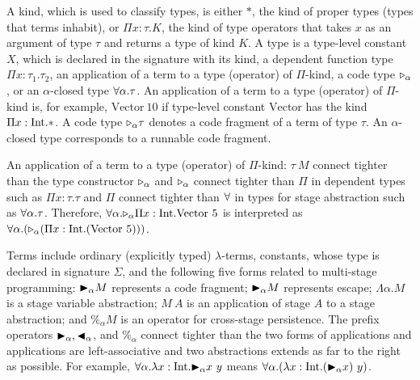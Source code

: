 


A kind, which is used to classify types, is either $*$, the kind of
proper types (types that terms inhabit), or $\Pi x\colon\tau.K$, the kind
of type operators that takes $x$ as an argument of type $\tau$ and returns a type
of kind $K$.
A type is a type-level constant $X$, which is declared in the signature with its kind, a dependent function type $\Pi x:\tau_1.\tau_2$,
an application of a term to a type (operator) of $\Pi$-kind, a code type ${\mathop{\triangleright}}_\alpha$, or an $\alpha$-closed type $\forall\alpha.\tau$.
An application of a term to a type (operator) of $\Pi$-kind is, for example, $\text{Vector}\ 10$
if type-level constant $\text{Vector}$ has the kind $\Pi x:\textrm{Int}.*$.
A code type ${\mathop{\triangleright}}_\alpha \tau$ denotes a code fragment of a term of type $\tau$.
An $\alpha$-closed type corresponds to a runnable code fragment.

An application of a term to a type (operator) of $\Pi$-kind: $\tau\ M$ connect tighter than
the type constructor ${\mathop{\triangleright}}_{\alpha}$ and ${\mathop{\triangleright}}_{\alpha}$ connect tighter than
$\Pi$ in dependent types such as $\Pi x:\tau.\tau$ and $\Pi$ connect tighter than
$\forall$ in types for stage abstraction such as $\forall\alpha.\tau$.
Therefore, $\F\alpha.\TW_{\alpha} \Pi x:\I.\text{Vector}\ 5$ is interpreted as
$\F\alpha.(\TW_{\alpha} (\Pi x:\I.(\text{Vector}\ 5)))$.


Terms include ordinary (explicitly typed) \(\lambda\)-terms, constants,
whose type is declared in signature $\Sigma$, and the following five forms
related to multi-stage programming:
${\mathop{\blacktriangleright}}_\alpha M$ represents a code fragment; ${\mathop{\blacktriangleright}}_\alpha M$ represents escape;
$\Lambda\alpha.M$ is a stage variable abstraction;
$M\ A$ is an application of stage $A$ to a stage abstraction; and
$\%_\alpha M$ is an operator for cross-stage persistence.
The prefix operators ${\mathop{\blacktriangleright}}_\alpha, {\mathop{\blacktriangleleft}}_\alpha$, and $\%_\alpha$ connect tighter than the two forms of applications
and applications are left-associative
and two abstractions extends as far to the right as possible.
For example, $\forall\alpha.\lambda x:\textrm{Int}.{\mathop{\blacktriangleright}}_\alpha x\ y$ means $\F\alpha.(\lambda x:\I.(\TB_\alpha x)\ y)$.

